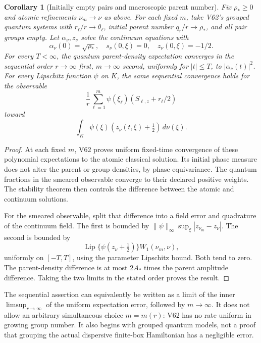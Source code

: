 \documentclass[11pt]{article}
\newtheorem{corollary}[theorem]{Corollary}
\theoremstyle{remark}
\begin{document}
\begin{corollary}[Initially empty pairs and macroscopic parent number]
\label{cor:v20v63-sequential}
Fix \(\rho_*\geq0\) and atomic refinements \(\nu_m\to\nu\)
as above.  For each fixed \(m\), take V62's grouped
quantum systems with \(r_\ell/r\to\theta_\ell\),
initial parent number \(q_r/r\to\rho_*\), and all pair
groups empty.  Let \(\alpha_\nu,z_\nu\) solve the
continuum equations with
\[
 \alpha_\nu(0)=\sqrt{\rho_*},\quad
 s_\nu(0,\xi)=0,\quad z_\nu(0,\xi)=-1/2.
\]
For every \(T<\infty\), the quantum parent-density
expectation converges in the sequential order
\(r\to\infty\) first, \(m\to\infty\) second, uniformly
for \(|t|\leq T\), to \(|\alpha_\nu(t)|^2\).
For every Lipschitz function \(\psi\) on \(K\), the
same sequential convergence holds for the observable
\[
 \frac1r\sum_{\ell=1}^m\psi(\xi_\ell)
                  (S_{\ell,z}+r_\ell/2)
\]
toward
\[
 \int_K\psi(\xi)(z_\nu(t,\xi)+\tfrac12)\,d\nu(\xi).
\]
\end{corollary}
\begin{proof}
At each fixed \(m\), V62 proves uniform fixed-time
convergence of these polynomial expectations to the
atomic classical solution.  Its initial phase measure
does not alter the parent or group densities, by phase
equivariance.  The quantum fractions in the smeared
observable converge to their declared positive weights.
The stability theorem then controls the difference
between the atomic and continuum solutions.

For the smeared observable, split that difference
into a field error and quadrature of the continuum
field.  The first is bounded by
\(\|\psi\|_\infty\sup_\xi|z_{\nu_m}-z_\nu|\).
The second is bounded by
\[
 \operatorname{Lip}\{\psi(z_\nu+\tfrac12)\}
                               W_1(\nu_m,\nu),
\]
uniformly on \([-T,T]\), using the parameter Lipschitz
bound.  Both tend to zero.  The parent-density
difference is at most \(2A_*\) times the parent
amplitude difference.  Taking the two limits in the
stated order proves the result.
\end{proof}

The sequential assertion can equivalently be written
as a limit of the inner \(\limsup_{r\to\infty}\) of
the uniform expectation error, followed by \(m\to\infty\).
It does not allow an arbitrary simultaneous choice
\(m=m(r)\): V62 has no rate uniform in growing group
number.  It also begins with grouped quantum models,
not a proof that grouping the actual dispersive
finite-box Hamiltonian has a negligible error.
\end{document}
